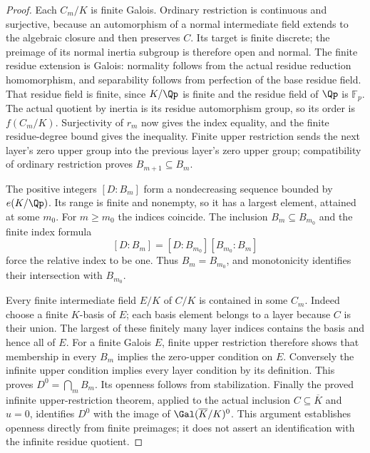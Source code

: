 \begin{proof}
Each $C_m/K$ is finite Galois. Ordinary restriction is continuous
and surjective, because an automorphism of a normal intermediate
field extends to the algebraic closure and then preserves $C$.
Its target is finite discrete; the preimage of its normal inertia
subgroup is therefore open and normal. The finite residue extension
is Galois: normality follows from the actual residue reduction
homomorphism, and separability follows from perfection of the
base residue field. That residue field is finite, since $K/\Qp$
is finite and the residue field of $\Qp$ is $\mathbb F_p$.
The actual quotient by inertia is its residue automorphism group,
so its order is $f(C_m/K)$. Surjectivity of $r_m$ now gives the
index equality, and the finite residue-degree bound gives the
inequality. Finite upper restriction sends the next layer's zero
upper group into the previous layer's zero upper group; compatibility
of ordinary restriction proves $B_{m+1}\subseteq B_m$.

The positive integers $[D:B_m]$ form a nondecreasing sequence
bounded by $e(K/\Qp)$. Its range is finite and nonempty, so it
has a largest element, attained at some $m_0$. For $m\geq m_0$
the indices coincide. The inclusion $B_m\subseteq B_{m_0}$ and
the finite index formula
\[
 [D:B_m]=[D:B_{m_0}][B_{m_0}:B_m]
\]
force the relative index to be one. Thus $B_m=B_{m_0}$, and
monotonicity identifies their intersection with $B_{m_0}$.

Every finite intermediate field $E/K$ of $C/K$ is contained in
some $C_m$. Indeed choose a finite $K$-basis of $E$; each basis
element belongs to a layer because $C$ is their union. The largest
of these finitely many layer indices contains the basis and hence
all of $E$. For a finite Galois $E$, finite upper restriction
therefore shows that membership in every $B_m$ implies the
zero-upper condition on $E$. Conversely the infinite upper condition
implies every layer condition by its definition. This proves
$D^0=\bigcap_m B_m$. Its openness follows from stabilization.
Finally the proved infinite upper-restriction theorem, applied to
the actual inclusion $C\subseteq\overline K$ and $u=0$, identifies
$D^0$ with the image of $\Gal(\overline K/K)^0$.
This argument establishes openness directly from finite preimages;
it does not assert an identification with the infinite residue quotient.
\end{proof}

